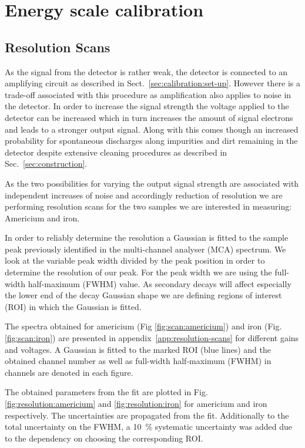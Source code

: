 \section{Energy scale calibration}

\subsection{Resolution Scans}
\label{sec:resolution_scans}
As the signal from the detector is rather weak, the detector is connected to an
amplifying circuit as described in Sect.~\ref{sec:calibration:set-up}. However
there is a trade-off associated with this procedure as amplification also
applies to noise in the detector. In order to increase the signal strength the
voltage applied to the detector can be increased which in turn increases the
amount of signal electrons and leads to a stronger output signal. Along with
this comes though an increased probability for spontaneous discharges along
impurities and dirt remaining in the detector despite extensive cleaning
procedures as described in Sec.~\ref{sec:construction}.

As the two possibilities for varying the output signal strength are associated
with independent increases of noise and accordingly reduction of resolution we
are performing resolution scans for the two samples we are interested in
measuring: Americium and iron.

In order to reliably determine the resolution a Gaussian is fitted to the sample
peak previously identified in the multi-channel analyser (MCA) spectrum. We look
at the variable peak width divided by the peak position in order to determine
the resolution of our peak. For the peak width we are using the full-width
half-maximum (FWHM) value. As secondary decays will affect especially the lower
end of the decay Gaussian  shape we are defining regions of interest (ROI) in which the Gaussian
is fitted.

The spectra obtained for americium (Fig \ref{fig:scan:americium}) and iron
(Fig. \ref{fig:scan:iron}) are presented in appendix~\ref{app:resolution-scans} for different gains and voltages.
A Gaussian is fitted to the marked ROI (blue lines) and the obtained channel number as well as
full-width half-maximum (FWHM) in channels are denoted in each figure.

The obtained parameters from the fit are plotted in Fig.
\ref{fig:resolution:americium} and \ref{fig:resolution:iron} for americium and
iron respectively. The uncertainties are propagated from the fit. Additionally to the
total uncertainty on the FWHM, a \SI{10}{\percent} systematic
uncertainty was added due to the dependency on choosing the corresponding ROI.

